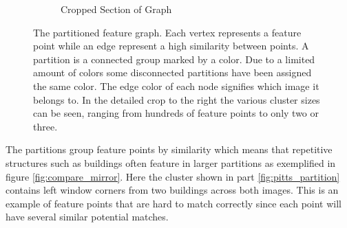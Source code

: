 \documentclass[12pt,journal,compsoc]{IEEEtran}
\begin{document}
\begin{figure}
{\begin{subfigure}[t]{0.3\textwidth}
			\caption{Cropped Section of Graph}
			\label{fig:cropped_graph}
		\end{subfigure}%
	}%
	\caption{The partitioned feature graph. Each vertex represents a 
		feature point while an edge represent a high similarity between 
		points. A partition is a connected group marked by a color.  Due 
		to a limited amount of colors some disconnected partitions have 
		been assigned the same color. The edge color of each node 
		signifies which image it belongs to. In the detailed crop to the 
		right the various cluster sizes can be seen, ranging from 
	hundreds of feature points to only two or three.}
	\label{fig:graph}
\end{figure}
%
The partitions group feature points by similarity which means that 
repetitive structures such as buildings often feature in larger 
partitions as exemplified in figure \ref{fig:compare_mirror}. Here the 
cluster shown in part \ref{fig:pitts_partition} contains left window 
corners from two buildings across both images. This is an example of 
feature points that are hard to match correctly since each point will 
have several similar potential matches.
%
\end{document}
